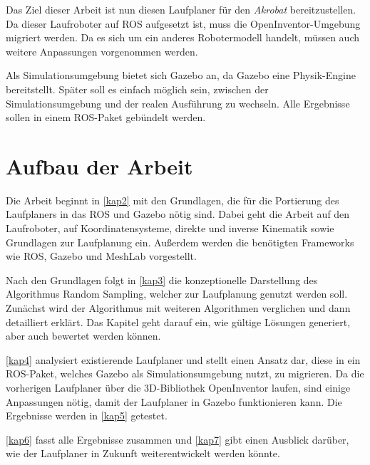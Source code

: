 Das Ziel dieser Arbeit ist nun diesen Laufplaner für den \emph{Akrobat} bereitzustellen. Da dieser Laufroboter auf \ac{ROS} aufgesetzt ist, muss die OpenInventor-Umgebung migriert werden. Da es sich um ein anderes Robotermodell handelt, müssen auch weitere Anpassungen vorgenommen werden.

Als Simulationsumgebung bietet sich Gazebo an, da Gazebo eine Physik-Engine bereitstellt. Später soll es einfach möglich sein, zwischen der Simulationsumgebung und der realen Ausführung zu wechseln. Alle Ergebnisse sollen in einem \ac{ROS}-Paket gebündelt werden.

\section{Aufbau der Arbeit}

Die Arbeit beginnt in \autoref{kap2} mit den Grundlagen, die für die Portierung des Laufplaners in das \ac{ROS} und Gazebo nötig sind. Dabei geht die Arbeit auf den Laufroboter, auf Koordinatensysteme, direkte und inverse Kinematik sowie Grundlagen zur Laufplanung ein. Außerdem werden die benötigten Frameworks wie \ac{ROS}, Gazebo und MeshLab vorgestellt.

Nach den Grundlagen folgt in \autoref{kap3} die konzeptionelle Darstellung des Algorithmus Random Sampling, welcher zur Laufplanung genutzt werden soll. Zunächst wird der Algorithmus mit weiteren Algorithmen verglichen und dann detailliert erklärt. Das Kapitel geht darauf ein, wie gültige Lösungen generiert, aber auch bewertet werden können.

\autoref{kap4} analysiert existierende Laufplaner und stellt einen Ansatz dar, diese in ein \ac{ROS}-Paket, welches Gazebo als Simulationsumgebung nutzt, zu migrieren. Da die vorherigen Laufplaner über die 3D-Bibliothek OpenInventor laufen, sind einige Anpassungen nötig, damit der Laufplaner in Gazebo funktionieren kann. Die Ergebnisse werden in \autoref{kap5} getestet.

\autoref{kap6} fasst alle Ergebnisse zusammen und \autoref{kap7} gibt einen Ausblick darüber, wie der Laufplaner in Zukunft weiterentwickelt werden könnte.